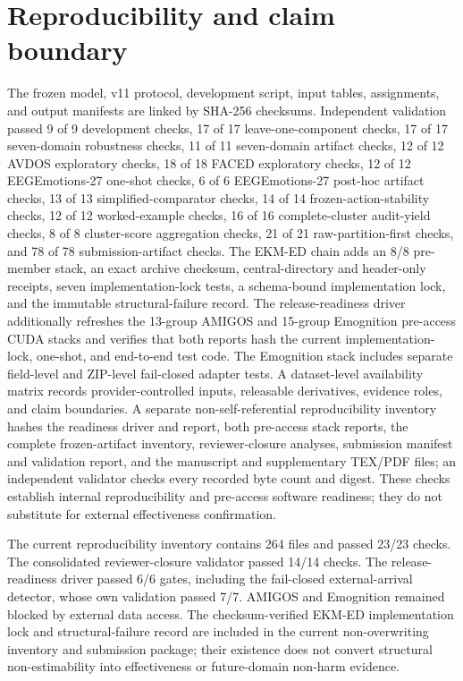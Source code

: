 \documentclass[preprint,12pt]{elsarticle}
\begin{document}
\section{Reproducibility and claim boundary}

The frozen model, v11 protocol, development script, input tables, assignments, and output manifests are linked by SHA-256 checksums. Independent validation passed 9 of 9 development checks, 17 of 17 leave-one-component checks, 17 of 17 seven-domain robustness checks, 11 of 11 seven-domain artifact checks, 12 of 12 AVDOS exploratory checks, 18 of 18 FACED exploratory checks, 12 of 12 EEGEmotions-27 one-shot checks, 6 of 6 EEGEmotions-27 post-hoc artifact checks, 13 of 13 simplified-comparator checks, 14 of 14 frozen-action-stability checks, 12 of 12 worked-example checks, 16 of 16 complete-cluster audit-yield checks, 8 of 8 cluster-score aggregation checks, 21 of 21 raw-partition-first checks, and 78 of 78 submission-artifact checks. The EKM-ED chain adds an 8/8 pre-member stack, an exact archive checksum, central-directory and header-only receipts, seven implementation-lock tests, a schema-bound implementation lock, and the immutable structural-failure record. The release-readiness driver additionally refreshes the 13-group AMIGOS and 15-group Emognition pre-access CUDA stacks and verifies that both reports hash the current implementation-lock, one-shot, and end-to-end test code. The Emognition stack includes separate field-level and ZIP-level fail-closed adapter tests. A dataset-level availability matrix records provider-controlled inputs, releasable derivatives, evidence roles, and claim boundaries. A separate non-self-referential reproducibility inventory hashes the readiness driver and report, both pre-access stack reports, the complete frozen-artifact inventory, reviewer-closure analyses, submission manifest and validation report, and the manuscript and supplementary TEX/PDF files; an independent validator checks every recorded byte count and digest. These checks establish internal reproducibility and pre-access software readiness; they do not substitute for external effectiveness confirmation.

The current reproducibility inventory contains 264 files and passed 23/23 checks. The consolidated reviewer-closure validator passed 14/14 checks. The release-readiness driver passed 6/6 gates, including the fail-closed external-arrival detector, whose own validation passed 7/7. AMIGOS and Emognition remained blocked by external data access. The checksum-verified EKM-ED implementation lock and structural-failure record are included in the current non-overwriting inventory and submission package; their existence does not convert structural non-estimability into effectiveness or future-domain non-harm evidence.
\end{document}
